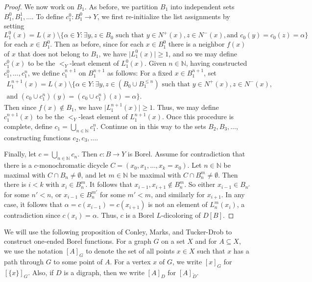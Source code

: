 \documentclass[psamsfonts]{amsart}
\theoremstyle{definition}
\newcommand{\N}{\mathbb N}
\theoremstyle{remark}
\numberwithin{equation}{section}
\begin{document}
\begin{proof}
    We now work on $B_1$. As before, we partition $B_1$ into independent sets $B_1^0, B_1^1, \dots$. To define $c_1^0 : B_1^0 \to Y$, we first re-initialize the list assignments by setting
    $$L_1^0(x) = L(x) \setminus \{\alpha \in Y : \exists y, z \in B_0 \text{ such that } y \in N^+(x), z \in N^-(x), \text{and } c_0(y) = c_0(z) = \alpha \}$$
    for each $x \in B_1^0$. Then as before, since for each $x \in B_1^0$ there is a neighbor $f(x)$ of $x$ that does not belong to $B_1$, we have $\vert L_1^0(x) \vert \geq 1$, and so we may define $c_1^0(x)$ to be the $<_Y$-least element of $L_1^0(x)$. Given $n \in \N$, having constructed $c_1^0, \dots, c_1^n$, we define $c_1^{n + 1}$ on $B_1^{n + 1}$ as follows: For a fixed $x \in B_1^{n + 1}$, set
    \begin{align*}
        L_1^{n + 1}(x) = L(x) \setminus \{\alpha \in Y : \exists y, z \in (B_0 \cup B_1^{\leq n}) \text{ such that } y \in N^+(x), z \in N^-(x), \\ \text{and } (c_0 \cup c_1^n)(y) = (c_0 \cup c_1^n)(z) = \alpha \}.
    \end{align*}
    Then since $f(x) \notin B_1$, we have $\vert L_1^{n + 1}(x) \vert \geq 1$. Thus, we may define $c_1^{n + 1}(x)$ to be the $<_Y$-least element of $L_1^{n + 1}(x)$. Once this procedure is complete, define $c_1 = \bigcup_{n \in \N} c_1^n$. Continue on in this way to the sets $B_2, B_3, \dots$, constructing functions $c_2, c_3, \dots$.

    Finally, let $c = \bigcup_{n \in \N} c_n$. Then $c : B \to Y$ is Borel. Assume for contradiction that there is a $c$-monochromatic dicycle $C = (x_0, x_1, \dots, x_k = x_0)$. Let $n \in \N$ be maximal with $C \cap B_n \neq \emptyset$, and let $m \in \N$ be maximal with $C \cap B_n^m \neq \emptyset$. Then there is $i < k$ with $x_i \in B_n^m$. It follows that $x_{i - 1}, x_{i + 1} \notin B_n^m$. So either $x_{i - 1} \in B_{n'}$ for some $n' < n$, or $x_{i - 1} \in B_n^{m'}$ for some $m' < m$, and similarly for $x_{i + 1}$. In any case, it follows that $\alpha = c(x_{i - 1}) = c(x_{i + 1})$ is not an element of $L_n^m(x_i)$, a contradiction since $c(x_i) = \alpha$. Thus, $c$ is a Borel $L$-dicoloring of $D[B]$.
\end{proof}

We will use the following proposition of Conley, Marks, and Tucker-Drob to construct one-ended Borel functions. For a graph $G$ on a set $X$ and for $A \subseteq X$, we use the notation $[A]_G$ to denote the set of all points $x \in X$ such that $x$ has a path through $G$ to some point of $A$. For a vertex $x$ of $G$, we write $[x]_G$ for $[\{x\}]_G$. Also, if $D$ is a digraph, then we write $[A]_D$ for $[A]_{\tilde{D}}$.
\end{document}
